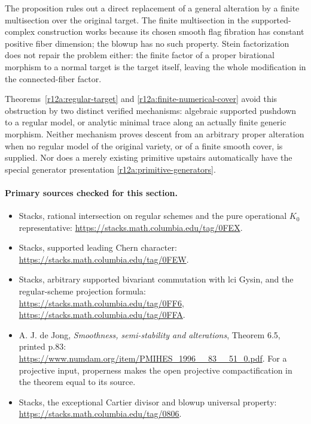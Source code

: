 The proposition rules out a direct replacement of a general alteration
by a finite multisection over the original target.  The finite
multisection in the supported-complex construction works because its
chosen smooth flag fibration has constant positive fiber dimension;
the blowup has no such property.  Stein factorization does not repair
the problem either: the finite factor of a proper birational morphism
to a normal target is the target itself, leaving the whole modification
in the connected-fiber factor.

Theorems~\ref{r12a:regular-target} and
\ref{r12a:finite-numerical-cover} avoid this obstruction by two distinct
verified mechanisms: algebraic supported pushdown to a regular model,
or analytic minimal trace along an actually finite generic morphism.
Neither mechanism proves descent from an arbitrary proper alteration
when no regular model of the original variety, or of a finite smooth
cover, is supplied.  Nor does a merely existing primitive upstairs
automatically have the special generator presentation
\eqref{r12a:primitive-generators}.

\paragraph{Primary sources checked for this section.}
\begin{itemize}
\item Stacks, rational intersection on regular schemes and the pure
operational $K_0$ representative:
\url{https://stacks.math.columbia.edu/tag/0FEX}.
\item Stacks, supported leading Chern character:
\url{https://stacks.math.columbia.edu/tag/0FEW}.
\item Stacks, arbitrary supported bivariant commutation with lci Gysin,
and the regular-scheme projection formula:
\url{https://stacks.math.columbia.edu/tag/0FF6},
\url{https://stacks.math.columbia.edu/tag/0FFA}.
\item A. J. de Jong, \emph{Smoothness, semi-stability and alterations},
Theorem 6.5, printed p.83:
\url{https://www.numdam.org/item/PMIHES_1996__83__51_0.pdf}.
For a projective input, properness makes the open projective
compactification in the theorem equal to its source.
\item Stacks, the exceptional Cartier divisor and blowup universal
property: \url{https://stacks.math.columbia.edu/tag/0806}.
\end{itemize}
